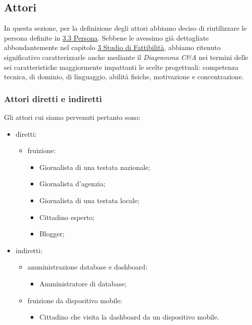\subsection{Attori}
\label{ss:attori}
In questa sezione, per la definizione degli attori abbiamo deciso di riutilizzare le persona definite in \hyperref[s:persona]{3.3 Persona}.
Sebbene le avessimo già dettagliate abbondantemente nel capitolo \hyperref[c:studio-fattibilita]{3 Studio di Fattibilità}, abbiamo ritenuto significativo caratterizzarle anche mediante il \textit{Diagramma C\&A} nei termini delle sei caratteristiche maggiormente impattanti le scelte progettuali: competenza tecnica, di dominio, di linguaggio, abilità fisiche, motivazione e concentrazione.

\noindent
\subsubsection{Attori diretti e indiretti}
\label{sss:attori-diretti-indiretti}
Gli attori cui siamo pervenuti pertanto sono:
\begin{itemize}
    \item diretti:
    \begin{itemize}
        \item fruizione:
        \begin{itemize}
            \item Giornalista di una testata nazionale;
            \item Giornalista d'agenzia;
            \item Giornalista di una testata locale;
            \item Cittadino esperto;
            \item Blogger;
        \end{itemize}
    \end{itemize}
    \item indiretti:
    \begin{itemize}
        \item amministrazione database e dashboard:
        \begin{itemize}
            \item Amministratore di database;
        \end{itemize}
        \item fruizione da dispositivo mobile:
        \begin{itemize}
            \item Cittadino che visita la dashboard da un dispositivo mobile.
        \end{itemize}
    \end{itemize}
\end{itemize}


